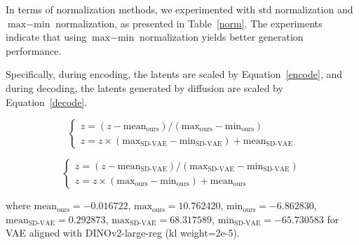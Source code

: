 In terms of normalization methods, we experimented with $\text{std}$ normalization and $\text{max}-\text{min}$ normalization, as presented in Table~\ref{norm}. The experiments indicate that using $\text{max}-\text{min}$ normalization yields better generation performance.

\begin{table}[ht]
\vskip 0.15in
\caption{\textbf{The impact of different normalization methods of latents on the quality of generation.} Use kl weight=5e-6, SiT-B/2 model at 400k optimization steps.}
\begin{center}
\begin{small}
\end{small}
\end{center}
\label{norm}
\vskip -0.1in
\end{table}

Specifically, during encoding, the latents are scaled by Equation~\ref{encode}, and during decoding, the latents generated by diffusion are scaled by Equation~\ref{decode}.

\begin{equation}
\left\{
\begin{matrix}
z=(z-\text{mean}_\text{ours})/(\text{max}_\text{ours}- 
\text{min}_\text{ours}) \\
z=z\times(\text{max}_\text{SD-VAE}-\text{min}_\text{SD-VAE})+\text{mean}_\text{SD-VAE} 
\end{matrix}
\right.
\label{encode}
\end{equation}

\begin{equation}
\left\{
\begin{matrix}
z=(z-\text{mean}_\text{SD-VAE})/(\text{max}_\text{SD-VAE}- 
\text{min}_\text{SD-VAE}) \\
z=z\times(\text{max}_\text{ours}-\text{min}_\text{ours})+\text{mean}_\text{ours} 
\end{matrix}
\right.
\label{decode}
\end{equation}

where $\text{mean}_\text{ours}=-0.016722$, $\text{max}_\text{ours}=10.762420$, $\text{min}_\text{ours}=-6.862830$, $\text{mean}_\text{SD-VAE}= 0.292873$, $\text{max}_\text{SD-VAE}=68.317589$, $\text{min}_\text{SD-VAE}=-65.730583$ for VAE aligned with DINOv2-large-reg (kl weight=2e-5).

